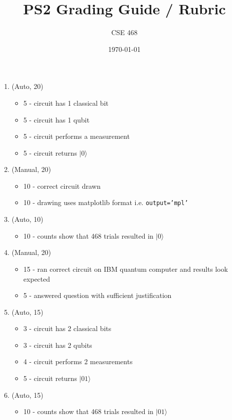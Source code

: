 \documentclass[12pt]{article}
\title{PS2 Grading Guide / Rubric}
\author{CSE 468}
\date{\today}
\begin{document}
\maketitle


\begin{enumerate}[font=\bfseries]
    \item (Auto, 20) 
    \begin{itemize}
        \item 5 - circuit has 1 classical bit
        \item 5 - circuit has 1 qubit
        \item 5 - circuit performs a measurement
        \item 5 - circuit returns $|0\rangle$
    \end{itemize}
    \item (Manual, 20)
    \begin{itemize}
        \item 10 - correct circuit drawn
        \item 10 - drawing uses matplotlib format i.e. \texttt{output='mpl'}
    \end{itemize}
    \item (Auto, 10) 
    \begin{itemize}
        \item 10 - counts show that 468 trials resulted in $|0\rangle$
    \end{itemize}
    \item (Manual, 20)
    \begin{itemize}
        \item 15 - ran correct circuit on IBM quantum computer and results look expected
        \item 5 - answered question with sufficient justification
    \end{itemize}
    \item (Auto, 15) 
    \begin{itemize}
        \item 3 - circuit has 2 classical bits
        \item 3 - circuit has 2 qubits
        \item 4 - circuit performs 2 measurements
        \item 5 - circuit returns $|01\rangle$
    \end{itemize}
    \item (Auto, 15) 
    \begin{itemize}
        \item 10 - counts show that 468 trials resulted in $|01\rangle$
    \end{itemize}
\end{enumerate}
\end{document}
